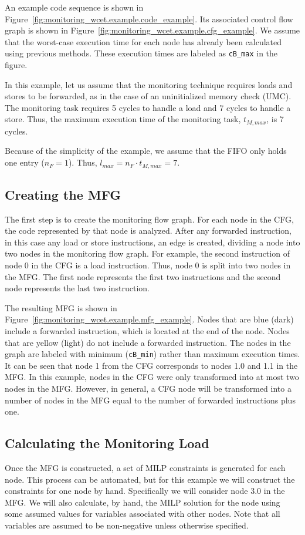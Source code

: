 An example code sequence is shown in
Figure~\ref{fig:monitoring_wcet.example.code_example}. Its associated control
flow graph is shown in
Figure~\ref{fig:monitoring_wcet.example.cfg_example}. We assume that the worst-case
execution time for each node has already been calculated using previous
methods. These execution times are labeled as {\tt cB\_max} in the figure.

In this example, let us assume that the monitoring technique requires loads and
stores to be forwarded, as in the case of an uninitialized memory check (UMC).
The monitoring task requires 5 cycles to handle a load and 7 cycles to handle a
store. Thus, the maximum execution time of the monitoring task, $t_{M, max}$,
is 7 cycles.

Because of the simplicity of the example, we assume that the FIFO only holds
one entry ($n_F = 1$). Thus, $l_{max} = n_F \cdot t_{M, max} = 7$.

\subsection{Creating the MFG}

The first step is to create the monitoring flow graph. For each node in the
CFG, the code represented by that node is analyzed. After any forwarded
instruction, in this case any load or store instructions, an edge is created,
dividing a node into two nodes in the monitoring flow graph. 
For example, the second instruction of node 0 in the CFG is a load instruction.
Thus, node 0 is split into two nodes in the MFG. The first node represents the
first two instructions and the second node represents the last two instruction. 

The resulting MFG is shown in Figure~\ref{fig:monitoring_wcet.example.mfg_example}.
Nodes that are blue (dark) include a forwarded instruction, which is located at
the end of the node. Nodes that are yellow (light) do not include a forwarded
instruction. The nodes in the graph are labeled with minimum ({\tt cB\_min})
rather than maximum execution times. It can be seen that node 1 from the CFG
corresponds to nodes 1.0 and 1.1 in the MFG. In this example, nodes in the CFG
were only transformed into at most two nodes in the MFG.  However, in general,
a CFG node will be transformed into a number of nodes in the MFG equal to the
number of forwarded instructions plus one.

\subsection{Calculating the Monitoring Load}
Once the MFG is constructed, a set of MILP constraints is generated for each
node. This process can be automated, but for this example we will construct the
constraints for one node by hand. Specifically we will consider node 3.0 in the
MFG. We will also calculate, by hand, the MILP solution for the node using some
assumed values for variables associated with other nodes. Note that all
variables are assumed to be non-negative unless otherwise specified.

